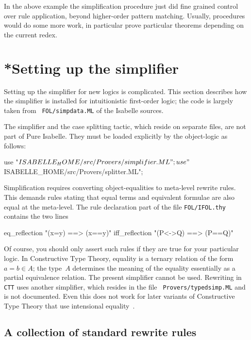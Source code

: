 \medskip

In the above example the simplification procedure just did fine
grained control over rule application, beyond higher-order pattern
matching.  Usually, procedures would do some more work, in particular
prove particular theorems depending on the current redex.


\section{*Setting up the simplifier}\label{sec:setting-up-simp}

Setting up the simplifier for new logics is complicated.  This section
describes how the simplifier is installed for intuitionistic
first-order logic; the code is largely taken from {\tt
  FOL/simpdata.ML} of the Isabelle sources.

The simplifier and the case splitting tactic, which reside on separate
files, are not part of Pure Isabelle.  They must be loaded explicitly
by the object-logic as follows:
\begin{ttbox}
use "$ISABELLE_HOME/src/Provers/simplifier.ML";
use "$ISABELLE_HOME/src/Provers/splitter.ML";
\end{ttbox}

Simplification requires converting object-equalities to meta-level rewrite
rules.  This demands rules stating that equal terms and equivalent formulae
are also equal at the meta-level.  The rule declaration part of the file
\texttt{FOL/IFOL.thy} contains the two lines
\begin{ttbox}
eq_reflection   "(x=y)   ==> (x==y)"
iff_reflection  "(P<->Q) ==> (P==Q)"
\end{ttbox}
Of course, you should only assert such rules if they are true for your
particular logic.  In Constructive Type Theory, equality is a ternary
relation of the form $a=b\in A$; the type~$A$ determines the meaning
of the equality essentially as a partial equivalence relation.  The
present simplifier cannot be used.  Rewriting in \texttt{CTT} uses
another simplifier, which resides in the file {\tt
  Provers/typedsimp.ML} and is not documented.  Even this does not
work for later variants of Constructive Type Theory that use
intensional equality~\cite{nordstrom90}.


\subsection{A collection of standard rewrite rules}

